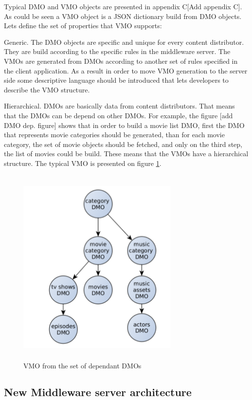 Typical DMO and VMO objects are presented in appendix C[Add appendix C]. As could be seen a VMO object is a JSON dictionary build from DMO objects. Lets define the set of properties that VMO supports:

Generic. The DMO objects are specific and unique for every content distributor. They are build according to the specific rules in the middleware server. The VMOs are generated from DMOs according to another set of rules specified in the client application. As a result in order to move VMO generation to the server side some descriptive language should be introduced that lets developers to describe the VMO structure.

Hierarchical. DMOs are basically data from content distributors. That means that the DMOs can be depend on other DMOs. For example, the figure [add DMO dep. figure] shows that in order to build a movie list DMO, first the DMO that represents movie categories should be generated, than for each movie category, the set of movie objects should be fetched, and only on the third step, the list of movies could be build. These means that the VMOs have a hierarchical structure. The typical VMO is presented on figure \ref{fig:vmo_example}.

\begin{figure}[h]
    \centering
	\includegraphics[width=8cm,height=10cm,keepaspectratio]{images/vmo_example.png}
    \caption{VMO from the set of dependant DMOs}
    \label{fig:vmo_example}
\end{figure} 

\subsection{New Middleware server architecture}

